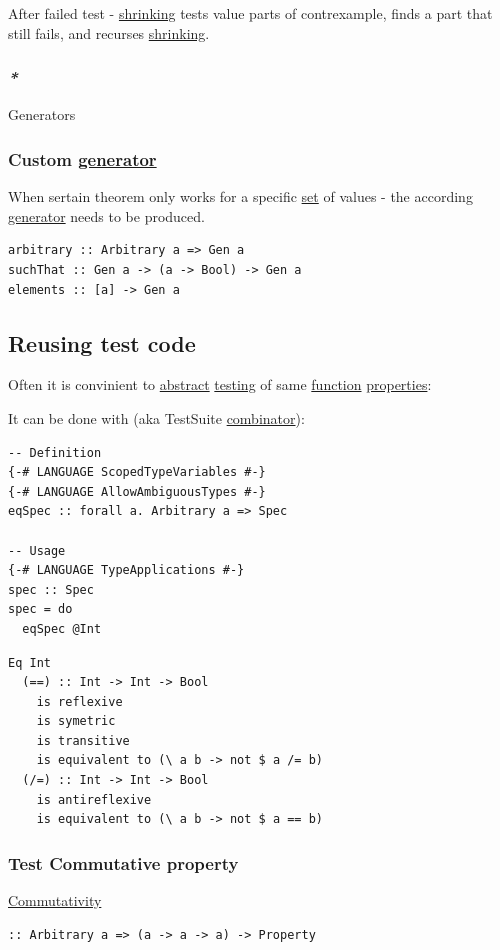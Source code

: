 \documentclass[a4paper,14pt,oneside]{book}
\begin{document}
After failed test - \hyperref[orgfdb0c80]{shrinking} tests value parts of contrexample, finds a part that still fails, and recurses \hyperref[orgfdb0c80]{shrinking}.

\subsubsection{\emph{*}}
\label{sec:org98105f4}

\label{org4e116c0}Generators

\subsubsection{Custom \hyperref[org29306eb]{generator}}
\label{sec:org877b793}
When sertain theorem only works for a specific \hyperref[org8d6310c]{set} of values - the according \hyperref[org29306eb]{generator} needs to be produced.

\begin{verbatim}
arbitrary :: Arbitrary a => Gen a
suchThat :: Gen a -> (a -> Bool) -> Gen a
elements :: [a] -> Gen a
\end{verbatim}

\subsection{\label{orgd88ceed}Reusing test code}
\label{sec:orgcb9aa45}
Often it is convinient to \hyperref[org57c42cd]{abstract} \hyperref[orgf0e202c]{testing} of same \hyperref[orgf54a964]{function} \hyperref[orgb42a88f]{properties}:

It can be done with (aka TestSuite \hyperref[org9313c75]{combinator}):
\begin{verbatim}
-- Definition
{-# LANGUAGE ScopedTypeVariables #-}
{-# LANGUAGE AllowAmbiguousTypes #-}
eqSpec :: forall a. Arbitrary a => Spec

-- Usage
{-# LANGUAGE TypeApplications #-}
spec :: Spec
spec = do
  eqSpec @Int
\end{verbatim}

\begin{verbatim}
Eq Int
  (==) :: Int -> Int -> Bool
    is reflexive
    is symetric
    is transitive
    is equivalent to (\ a b -> not $ a /= b)
  (/=) :: Int -> Int -> Bool
    is antireflexive
    is equivalent to (\ a b -> not $ a == b)
\end{verbatim}

\subsubsection{\label{orge79b85e}Test Commutative property}
\label{sec:orge0f8094}
\hyperref[org35b9773]{Commutativity}
\begin{verbatim}
:: Arbitrary a => (a -> a -> a) -> Property
\end{verbatim}
\end{document}
